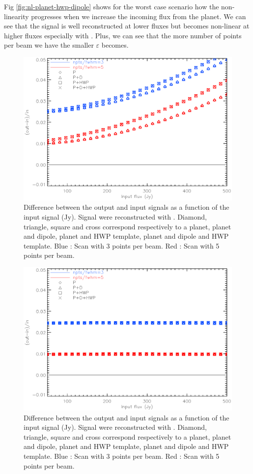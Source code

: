Fig \ref{fig:nl-planet-hwp-dipole} shows for the worst case scenario how the non-linearity progresses when we increase the incoming flux from the planet. We can see that the signal is well reconstructed at lower fluxes but becomes non-linear at higher fluxes especially with \rf. Plus, we can see that the more number of points per beam we have the smaller $\varepsilon$ becomes. 

\begin{figure}[h]
\center
	\includegraphics[scale=0.5]{Figures/diff-planet-hwp-dipole-rf.eps}
	\caption{Difference between the output and input signals as a function of the input signal (Jy). Signal were reconstructed with \rf. Diamond, triangle, square and cross correspond respectively to a planet, planet and dipole, planet and HWP template, planet and dipole and HWP template. Blue : Scan with 3 points per beam. Red : Scan with 5 points per beam.}
	\label{fig:diff-rf}
\end{figure}

\begin{figure}[h]
\center
	\includegraphics[scale=0.5]{Figures/diff-planet-hwp-dipole-cf.eps}
	\caption{Difference between the output and input signals as a function of the input signal (Jy). Signal were reconstructed with \cf. Diamond, triangle, square and cross correspond respectively to a planet, planet and dipole, planet and HWP template, planet and dipole and HWP template. Blue : Scan with 3 points per beam. Red : Scan with 5 points per beam.}
	\label{fig:diff-cf}
\end{figure}

